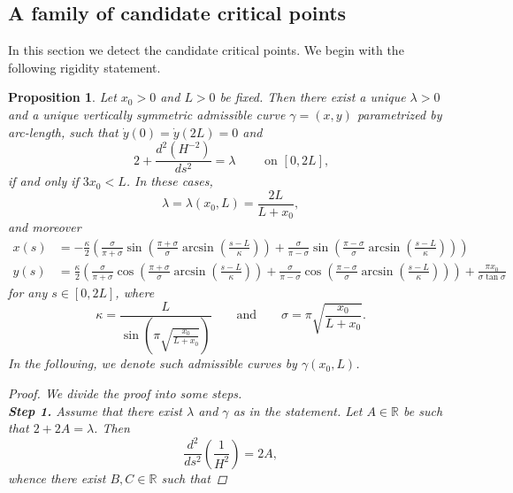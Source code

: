 \documentclass[11pt]{amsart}
\newcommand{\rr}{{\mathbb{R}}}
\renewcommand{\k}{\kappa}
\newtheorem{proposition}[theorem]{Proposition}
\theoremstyle{definition}
\theoremstyle{remark}
\numberwithin{equation}{section}
\begin{document}
	\subsection{A family of candidate critical points}\label{sec_candidates}
	In this section we detect the candidate critical points. We begin with the following rigidity statement.
	\begin{proposition}\label{scoprirepunticritici}
		Let $x_0>0$ and $L>0$ be fixed. Then 
		there exist a unique $\lambda>0$ and a unique vertically symmetric admissible curve $\gamma=(x,y)$ parametrized by arc-length, such that $\dot y(0)=\dot y(2L)=0$ and        \begin{equation}\label{equazionepuntocriticoinlemma}
			2+\frac{d^2(H^{-2})}{ds^2}=\lambda\qquad\text{ on $[0,2L]$,}
		\end{equation} 
		if and only if  $3x_0<L$.
		In these cases,
		\begin{equation}\label{definitionoflambda}
			\lambda=\lambda(x_0,L)=\frac{2L}{L+x_0},
		\end{equation}
		and moreover
		\begin{align*}
			x(s)&=-\frac{\k}{2}\left(\frac{\sigma}{\pi+\sigma}\sin\left(\frac{\pi+\sigma}{\sigma}\arcsin\left(\frac{s-L}{\k}\right)\right)+\frac{\sigma}{\pi-\sigma}\sin\left(\frac{\pi-\sigma}{\sigma}\arcsin\left(\frac{s-L}{\k}\right)\right)\right)\\
			y(s)&=\frac{\k}{2}\left(\frac{\sigma}{\pi+\sigma}\cos\left(\frac{\pi+\sigma}{\sigma}\arcsin\left(\frac{s-L}{\k}\right)\right)+\frac{\sigma}{\pi-\sigma}\cos\left(\frac{\pi-\sigma}{\sigma}\arcsin\left(\frac{s-L}{\k}\right)\right)\right)+\frac{\pi x_0}{\sigma\tan\sigma}
		\end{align*}
		for any $s\in[0,2L]$, where 
		\begin{equation}\label{keg}
			\k=\frac{L}{ \sin\left(\pi\sqrt{\frac{x_0}{L+x_0}}\right)}\qquad\text{and}\qquad \sigma=\pi\sqrt{\frac{x_0}{L+x_0}}.
		\end{equation}
		In the following, we denote such admissible curves by $\gamma(x_0,L)$.
		\begin{proof}
			We divide the proof into some steps.\\
			\textbf{Step 1.} Assume that there exist $\lambda$ and $\gamma$ as in the statement. Let $A\in\rr$ be such that $2+2A=\lambda$. 
			Then 
			\begin{equation*}
				\frac{d^2}{ds^2}\left(\frac{1}{H^2}\right)=2A,
			\end{equation*}
			whence there exist $B,C\in\rr$ such that

\end{proof}
\end{proposition}
\end{document}
